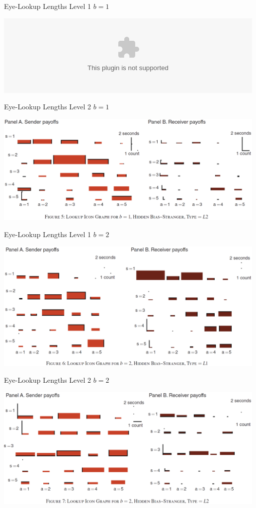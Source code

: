 \documentclass{beamer}
\begin{document}
\begin{frame}{Eye-Lookup Lengths Level 1 $b=1$}
\begin{card}
\includegraphics<1>[width=0.99\textwidth]{./i/wsc2010Fig4.eps}

\end{card}
\end{frame}

\begin{frame}{Eye-Lookup Lengths Level 2 $b=1$}
    \begin{card}
    \includegraphics[width=0.99\textwidth]{./i/wsc2010Fig5.eps}
    \end{card}
\end{frame}

\begin{frame}{Eye-Lookup Lengths Level 1 $b=2$}
\begin{card}
\includegraphics[width=0.99\textwidth]{./i/wsc2010Fig6.eps}
\end{card}
\end{frame}

\begin{frame}{Eye-Lookup Lengths Level 2 $b=2$}
\begin{card}
\includegraphics[width=0.99\textwidth]{./i/wsc2010Fig7.eps}
\end{card}
\end{frame}
\end{document}
